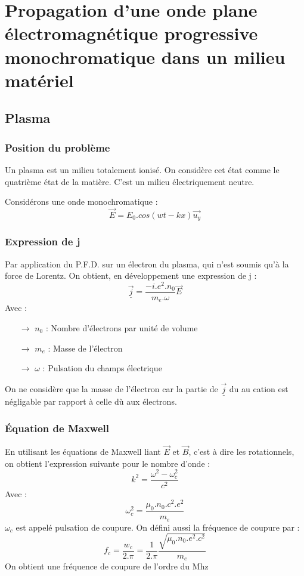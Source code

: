 \chapter{Propagation d'une onde plane électromagnétique progressive monochromatique dans un milieu matériel}
\section{Plasma}
\subsection{Position du problème}
\begin{de}
Un plasma est un milieu totalement ionisé. On considère cet état comme le quatrième état de la matière. C'est un milieu électriquement neutre.
\end{de}
Considérons une onde monochromatique : 
$$\overrightarrow{E} = E_0.cos(wt-kx)\overrightarrow{u_y}$$
\subsection{Expression de j}
Par application du P.F.D. sur un électron du plasma, qui n'est soumis qu'à la force de Lorentz. On obtient, en développement une expression de j : 
$$\underline{\overrightarrow{j}} = \dfrac{-i.e^2.n_0}{m_e.\omega}\overrightarrow{E}$$
Avec :
\begin{itemize}
 \item[$\rightarrow$] $n_0$ : Nombre d'électrons par unité de volume
 \item[$\rightarrow$] $m_e$ : Masse de l'électron
 \item[$\rightarrow$] $\omega$ : Pulsation du champs électrique
\end{itemize}
On ne considère que la masse de l'électron car la partie de $\underline{\overrightarrow{j}}$ du au cation est négligable par rapport à celle dù aux électrons.
\subsection{Équation de Maxwell}
En utilisant les équations de Maxwell liant $\overrightarrow{E}$ et $\overrightarrow{B}$, c'est à dire les rotationnels, on obtient l'expression suivante pour le nombre d'onde : 
$$k^2 = \dfrac{\omega^2 - \omega_c^2}{c^2}$$
Avec : 
$$\omega_c^2 = \dfrac{\mu_0.n_0.c^2.e^2}{m_e}$$
$\omega_c$ est appelé pulsation de coupure. On défini aussi la fréquence de coupure par : 
$$f_c = \dfrac{w_c}{2.\pi} = \dfrac{1}{2.\pi} \dfrac{\sqrt{\mu_0.n_0.e^2.c^2}}{m_e}$$
On obtient une fréquence de coupure de l'ordre du Mhz
